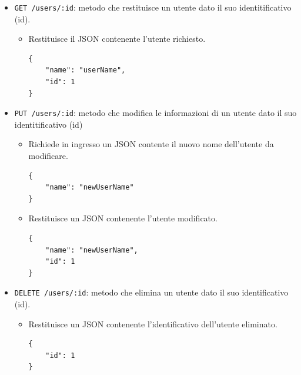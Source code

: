 \documentclass[a4paper]{article}
\begin{document}
\begin{itemize}
\begin{itemize}
\begin{verbatim}
    {
        "name": "userName",
        "id": 2
    }
]
        \end{verbatim}
    \end{itemize}
    \item \texttt{GET /users/:id}: metodo che restituisce un utente dato il suo identitificativo (id).
    \begin{itemize}
        \item Restituisce il JSON contenente l'utente richiesto.
        \begin{verbatim}
{
    "name": "userName",
    "id": 1
}
        \end{verbatim}
    \end{itemize}
    \item \texttt{PUT /users/:id}: metodo che modifica le informazioni di un utente dato il suo identitificativo (id)
    \begin{itemize}
        \item Richiede in ingresso un JSON contente il nuovo nome dell'utente da modificare.
        \begin{verbatim}
{
    "name": "newUserName"
}
        \end{verbatim}
        \item Restituisce un JSON contenente l'utente modificato.
        \begin{verbatim}
{
    "name": "newUserName",
    "id": 1
}
        \end{verbatim}
    \end{itemize}
    \item \texttt{DELETE /users/:id}: metodo che elimina un utente dato il suo identificativo (id).
    \begin{itemize}
        \item Restituisce un JSON contenente l'identificativo dell'utente eliminato.
        \begin{verbatim}
{
    "id": 1
}
        \end{verbatim}
    \end{itemize}
\end{itemize}
\end{document}
